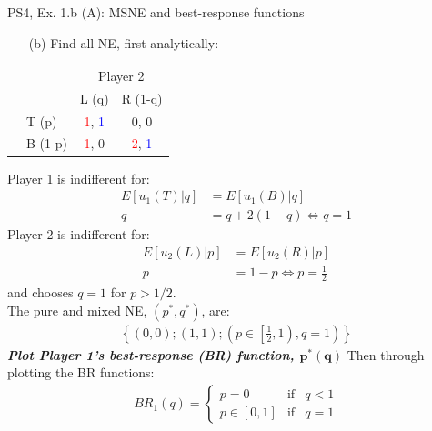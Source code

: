 \begin{frame}{PS4, Ex. 1.b (A): MSNE and best-response functions}
  \begin{multicols}{2}
    \begin{itemize}
      \item[(b)] Find all NE, first analytically:
    \end{itemize}
    \begin{table}
      \begin{tabular}{cl|c|c|}
        & \multicolumn{1}{c}{} & \multicolumn{2}{c}{\color{blue}Player 2}\\
        \parbox[t]{1mm}{}
        &  &  &  \\
        & T (p) & \textcolor{red}{1}, \textcolor{blue}{1} & 0, 0 \\
        & B (1-p) & \textcolor{red}{1}, 0 & \textcolor{red}{2}, \textcolor{blue}{1} \\
      \end{tabular}
    \end{table}
    Player 1 is indifferent for:
    \begin{align*}
      E[u_1(T)|q]&=E[u_1(B)|q]\\
      q &= q + 2(1-q) \Leftrightarrow q = 1
    \end{align*}
    Player 2 is indifferent for:
    \begin{align*}
      E[u_2(L)|p]&=E[u_2(R)|p]\\
      p &= 1-p \Leftrightarrow p = \frac{1}{2}
    \end{align*}
    and chooses $q=1$ for $p>1/2$.\\\medskip
    The pure and mixed NE, $(p^{*},q^{*})$, are:
    \begin{align*}
      \left\{(0,0);(1,1);\left(p\in\left[\frac{1}{2},1\right),q=1\right)\right\}
    \end{align*}
    \textbf{\textit{Plot Player 1's best-response (BR) function, $\bm{p^{*}(q)}$}}
  \vfill\null \columnbreak
    Then through plotting the BR functions:
    \vspace{-8pt}
    \begin{align*}
      BR_1(q)=\left\{ \begin{array}{lcl}
          p=0       & \text{if} & q<1 \\
          p\in[0,1] & \text{if} & q=1
      \end{array}\right.

\end{align*}
\end{multicols}
\end{frame}
